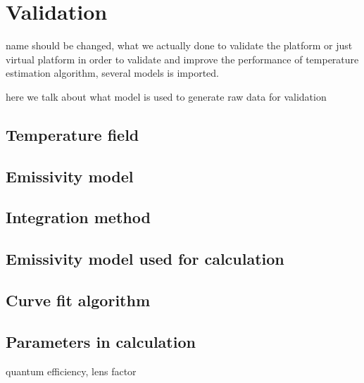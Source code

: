 \chapter{Validation}
name should be changed, what we actually done to validate the platform
or just virtual platform
in order to validate and improve the performance of temperature estimation algorithm, several 
models is imported.


here we talk about what model is used to generate raw data for validation
\section{Temperature field}%

%
%
\section{Emissivity model}%


\section{Integration method}

\section{Emissivity model used for calculation}

\section{Curve fit algorithm}

\section{Parameters in calculation}

quantum efficiency, lens factor